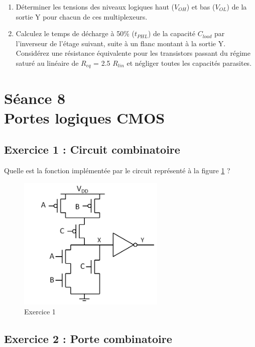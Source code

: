 \documentclass[paper=a4, fontsize=11pt]{article} %
\numberwithin{equation}{section} %
\numberwithin{figure}{section} %
\numberwithin{table}{section} %
\begin{document}
\begin{enumerate}
\item Déterminer les tensions des niveaux logiques haut ($V_{OH}$) et bas ($V_{OL}$) de la sortie Y pour chacun de ces multiplexeurs.
\item Calculez le temps de décharge à 50\% ($t_{PHL}$) de la capacité $C_{load}$ par l'inverseur de l'étage suivant, suite à un flanc montant à la sortie Y. Considérez une résistance équivalente pour les transistors passant du régime saturé au linéaire de $R_{eq}$ = 2.5 $R_{lin}$ et négliger toutes les capacités parasites.
\end{enumerate}










\newpage
\setcounter{figure}{0}
\setcounter{section}{8}
\section{Séance 8\\ Portes logiques CMOS}
\subsection*{Exercice 1 : Circuit combinatoire}
Quelle est la fonction implémentée par le circuit représenté à la figure \ref{fig8-1} ?
\begin{figure}[!htbp]
   \centering
   \includegraphics[width=7cm]{figure/fig8-1.png}
   \caption{Exercice 1}
   \label{fig8-1}
\end{figure}

\subsection*{Exercice 2 : Porte combinatoire}
\end{document}
